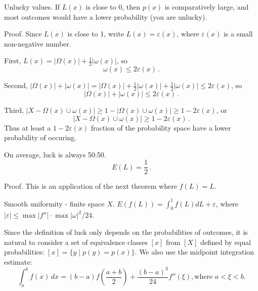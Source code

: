\begin{theorem}{Unlucky values.}
If $L(x)$ is close to 0, then $p(x)$ is comparatively large, and most outcomes would have a lower probability (you are unlucky).

Proof.  Since $L(x)$ is close to 1, write $L(x)=\varepsilon(x)$, where $\varepsilon(x)$ is a small non-negative number.

First, $L(x)=|\Omega(x)|+\frac{1}{2}|\omega(x)|$, so
\begin{equation*}
\omega(x) \leq 2\varepsilon(x) \,.
\end{equation*}

Second, $|\Omega(x)|+|\omega(x)|=|\Omega(x)|+\frac{1}{2}|\omega(x)|+\frac{1}{2}|\omega(x)| \leq 2\varepsilon(x)$, so
\begin{equation*}
|\Omega(x)|+|\omega(x)| \leq 2\varepsilon(x) \,.
\end{equation*}

Third, $|X-\Omega(x) \cup \omega(x)| \geq 1-|\Omega(x) \cup \omega(x)| \geq 1-2\varepsilon(x)$, or 
\begin{equation*}
|X-\Omega(x) \cup \omega(x)| \geq 1-2\varepsilon(x) \,.
\end{equation*}
Thus at least a $1-2 \varepsilon(x)$ fraction of the probability space have a lower probability of occuring.
\end{theorem}

\begin{theorem}{On average, luck is always 50:50.}
\begin{equation*}
E(L)=\frac{1}{2} \,.
\end{equation*}

Proof.  This is an application of the next theorem where $f(L)=L$.
\end{theorem}

\begin{theorem}{Smooth uniformity - finite space $X$.}
$E(f(L))=\int_0^1 f(L) dL+\varepsilon$, where $|\varepsilon| \leq \max|f''| \cdot \max |\omega|^2 / 24$.

Since the definition of luck only depends on the probabilities of outcomes, it is natural to consider a set of equivalence classes $[x]$ from $[X]$ defined by equal probabilities: $[x]=\{y \mid p(y)=p(x) \}$.  We also use the midpoint integration estimate:
\begin{equation*}
\int_a^b f(x) \, dx = (b-a)f(\frac{a+b}{2})+\frac{(b-a)^3}{24} f''(\xi), \text{where $a < \xi < b$.}
\end{equation*}
\end{theorem}
